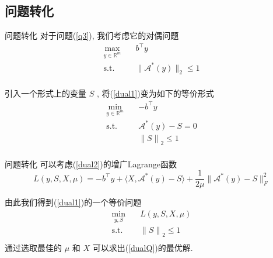 \documentclass[slidestop, compress, mathserif, UTF8]{beamer}
\numberwithin{equation}{section}                                        %
\begin{document}
		\subsection{问题转化}
			\begin{frame}[t]{问题转化}
				对于问题(\ref{q3}), 我们考虑它的对偶问题
				\begin{equation}
					\begin{split}\label{dual1}
						\max_{y \in \mathbb{R}^{m}} \quad
							& b^\top y\\
						\text{s.t.} \quad
							& \lVert{\mathcal{A}^*(y)}\rVert_2 \le 1\\
					\end{split}
				\end{equation}

				引入一个形式上的变量 $S$ , 将(\ref{dual1})变为如下的等价形式
				\begin{equation}
					\begin{split}\label{dual2}
						\min_{y \in \mathbb{R}^{m}} \quad
							& -b^\top y\\
						\text{s.t.} \quad
							& \mathcal{A}^*(y) - S = 0\\
							& {\lVert{S}\rVert}_2 \le 1\\
					\end{split}
				\end{equation}
			\end{frame}
			\begin{frame}[t]{问题转化}
				可以考虑(\ref{dual2})的增广Lagrange函数
				\begin{equation}\label{Lag}
						L(y, S, X, \mu)
					=	-b^\top y + \langle{X, \mathcal{A}^*(y) - S}\rangle + \frac{1}{2\mu} \lVert{\mathcal{A}^*(y) - S}\rVert^2_F
				\end{equation}

				由此我们得到(\ref{dual1})的一个等价问题
				\begin{equation}
					\begin{split}\label{dualQ}
						\min_{y,S} \quad
							& L(y, S, X, \mu)\\
						\text{s.t.} \quad
							& {\lVert{S}\rVert}_2 \le 1\\
					\end{split}
				\end{equation}
				通过选取最佳的 $\mu$ 和 $X$ 可以求出(\ref{dualQ})的最优解.
			\end{frame}
\end{document}
